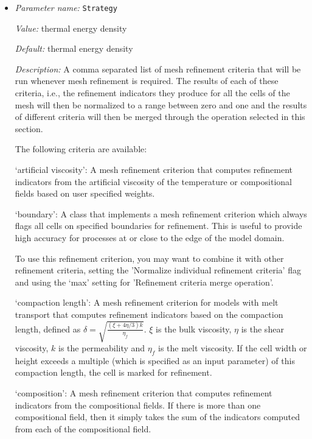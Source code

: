 \begin{itemize}
{\it Description:} Whether or not solvers should be executed during the initial adaptive refinement cycles that are run at the start of the simulation.


{\it Possible values:} A boolean value (true or false)
\item {\it Parameter name:} {\tt Strategy}
\label{parameters:Mesh refinement/Strategy}
\label{parameters:Mesh_20refinement/Strategy}


{\it Value:} thermal energy density


{\it Default:} thermal energy density


{\it Description:} A comma separated list of mesh refinement criteria that will be run whenever mesh refinement is required. The results of each of these criteria, i.e., the refinement indicators they produce for all the cells of the mesh will then be normalized to a range between zero and one and the results of different criteria will then be merged through the operation selected in this section.

The following criteria are available:

`artificial viscosity': A mesh refinement criterion that computes refinement indicators from the artificial viscosity of the temperature or compositional fields based on user specified weights.

`boundary': A class that implements a mesh refinement criterion which always flags all cells on specified boundaries for refinement. This is useful to provide high accuracy for processes at or close to the edge of the model domain.

To use this refinement criterion, you may want to combine it with other refinement criteria, setting the 'Normalize individual refinement criteria' flag and using the `max' setting for 'Refinement criteria merge operation'.

`compaction length': A mesh refinement criterion for models with melt transport that computes refinement indicators based on the compaction length, defined as $\delta = \sqrt{\frac{(\xi + 4 \eta/3) k}{\eta_f}}$. $\xi$ is the bulk viscosity, $\eta$ is the shear viscosity, $k$ is the permeability and $\eta_f$ is the melt viscosity. If the cell width or height exceeds a multiple (which is specified as an input parameter) of this compaction length, the cell is marked for refinement.

`composition': A mesh refinement criterion that computes refinement indicators from the compositional fields. If there is more than one compositional field, then it simply takes the sum of the indicators computed from each of the compositional field.


\end{itemize}
